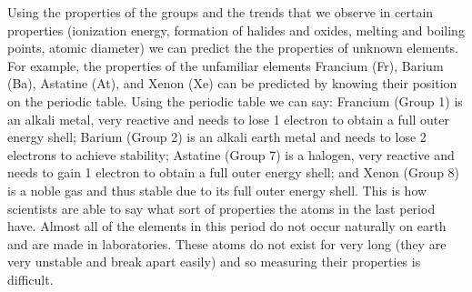 \label{m38760*eip-151}Using the properties of the groups and the trends that we observe in certain properties (ionization energy, formation of halides and oxides, melting and boiling points, atomic diameter) we can predict the the properties of unknown elements. For example, the properties of the unfamiliar elements Francium (Fr), Barium (Ba), Astatine (At), and Xenon (Xe) can be predicted by knowing their position on the periodic table. Using the periodic table we can say: Francium (Group 1) is an alkali metal, very reactive and needs to lose 1 electron to obtain a full outer energy shell; Barium (Group 2) is an alkali earth metal and needs to lose 2 electrons to achieve stability; Astatine (Group 7) is a halogen, very reactive and needs to gain 1 electron to obtain a full outer energy shell; and Xenon (Group 8) is a noble gas and thus stable due to its full outer energy shell.   This is how scientists are able to say what sort of properties the atoms in the last period have. Almost all of the elements in this period do not occur naturally on earth and are made in laboratories. These atoms do not exist for very long (they are very unstable and break apart easily) and so measuring their properties is difficult.\par \label{m38760*secfhsst!!!underscore!!!id1062}
